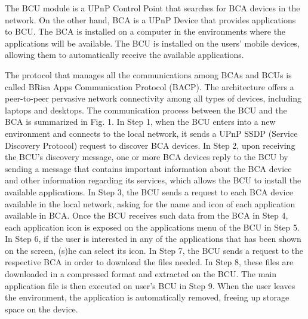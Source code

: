 \documentclass[journal]{IEEEtran}
\begin{document}
The BCU module is a UPnP Control Point that searches for BCA devices in the network. On the other hand, BCA is a UPnP Device that provides applications to BCU. The BCA is installed on a computer in the environments where the applications will be available. The BCU is installed on the users' mobile devices, allowing them to automatically receive the available applications.

The protocol that manages all the communications among BCAs and BCUs is called BRisa Apps Communication Protocol (BACP). The architecture offers a peer-to-peer pervasive network connectivity among all types of devices, including laptops and desktops. The communication process between the BCU and the BCA is summarized in Fig. 1. In Step 1, when the BCU enters into a new environment and connects to the local network, it sends a UPnP SSDP (Service Discovery Protocol) request to discover BCA devices. In Step 2, upon receiving the BCU's discovery message, one or more BCA devices reply to the BCU by sending a message that contains important information about the BCA device and other information regarding its services, which allows the BCU to install the available applications. In Step 3, the BCU sends a request to each BCA device available in the local network, asking for the name and icon of each application available in BCA. Once the BCU receives such data from the BCA in Step 4, each application icon is exposed on the applications menu of the BCU in Step 5. In Step 6, if the user is interested in any of the applications that has been shown on the screen, (s)he can select its icon. In Step 7, the BCU sends a request to the respective BCA in order to download the files needed. In Step 8, these files are downloaded in a compressed format and extracted on the BCU. The main application file is then executed on user's BCU in Step 9. When the user leaves the environment, the application is automatically removed, freeing up storage space on the device.
\end{document}
